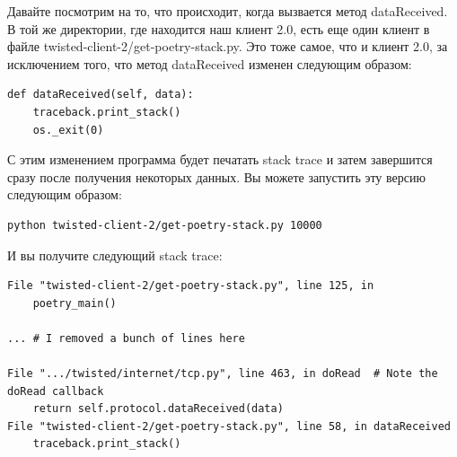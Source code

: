 
Давайте посмотрим на то, что происходит, когда вызвается метод dataReceived. 
В той же директории, где находится наш клиент 2.0, есть еще один клиент в файле 
twisted-client-2/get-poetry-stack.py. Это тоже самое, что и клиент 2.0, за 
исключением того, что метод dataReceived изменен следующим образом: 

\begin{scriptsize}\begin{verbatim}
def dataReceived(self, data):
    traceback.print_stack()
    os._exit(0)
\end{verbatim}\end{scriptsize}

С этим изменением программа будет печатать stack trace и затем 
завершится сразу после получения некоторых данных. Вы можете 
запустить эту версию следующим образом:

\begin{scriptsize}\begin{verbatim}
python twisted-client-2/get-poetry-stack.py 10000
\end{verbatim}\end{scriptsize}

И вы получите следующий stack trace:

\begin{scriptsize}\begin{verbatim}
File "twisted-client-2/get-poetry-stack.py", line 125, in
    poetry_main()

... # I removed a bunch of lines here

File ".../twisted/internet/tcp.py", line 463, in doRead  # Note the doRead callback
    return self.protocol.dataReceived(data)
File "twisted-client-2/get-poetry-stack.py", line 58, in dataReceived
    traceback.print_stack()
\end{verbatim}\end{scriptsize}


